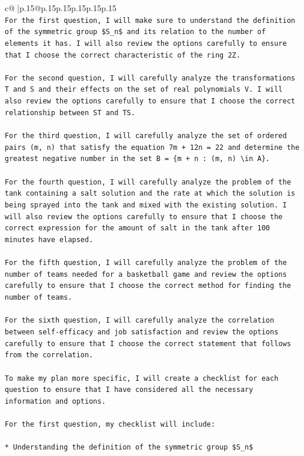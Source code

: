 \documentclass{article}
\begin{document}
{\begin{supertabular}{c@{$\;$}|p{.15\linewidth}@{}p{.15\linewidth}p{.15\linewidth}p{.15\linewidth}p{.15\linewidth}p{.15\linewidth}}
{{{\\ 
\texttt{For the first question, I will make sure to understand the definition of the symmetric group \$S\_n\$ and its relation to the number of elements it has. I will also review the options carefully to ensure that I choose the correct characteristic of the ring 2Z.} \\
\\ 
\texttt{For the second question, I will carefully analyze the transformations T and S and their effects on the set of real polynomials V. I will also review the options carefully to ensure that I choose the correct relationship between ST and TS.} \\
\\ 
\texttt{For the third question, I will carefully analyze the set of ordered pairs (m, n) that satisfy the equation 7m + 12n = 22 and determine the greatest negative number in the set B = \{m + n : (m, n) \textbackslash{}in A\}.} \\
\\ 
\texttt{For the fourth question, I will carefully analyze the problem of the tank containing a salt solution and the rate at which the solution is being sprayed into the tank and mixed with the existing solution. I will also review the options carefully to ensure that I choose the correct expression for the amount of salt in the tank after 100 minutes have elapsed.} \\
\\ 
\texttt{For the fifth question, I will carefully analyze the problem of the number of teams needed for a basketball game and review the options carefully to ensure that I choose the correct method for finding the number of teams.} \\
\\ 
\texttt{For the sixth question, I will carefully analyze the correlation between self{-}efficacy and job satisfaction and review the options carefully to ensure that I choose the correct statement that follows from the correlation.} \\
\\ 
\texttt{To make my plan more specific, I will create a checklist for each question to ensure that I have considered all the necessary information and options.} \\
\\ 
\texttt{For the first question, my checklist will include:} \\
\\ 
\texttt{* Understanding the definition of the symmetric group \$S\_n\$} \\
}}}
\end{supertabular}}
\end{document}
